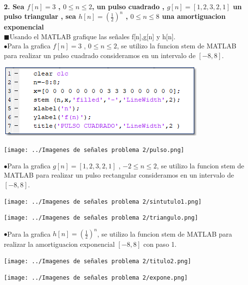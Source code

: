 \documentclass[10pt,a4paper]{article}
\begin{document}
\begin{center}
\begin{enumerate}
\textbf{2. Sea $f[n]=3$ , $0\leq n \leq 2$, un pulso cuadrado , $g[n]=[1,2,3,2,1]$ un pulso triangular , sea $h[n]=(\frac{1}{2})^n$ , $0\leq n\leq 8$ una amortiguacion exponencial}\\
$ \blacksquare$Usando el MATLAB grafique las señales f[n],g[n] y h[n].\\
$ \bullet$Para la grafica $f[n]=3$ , $ 0\leq n\leq 2$, se utilizo la funcion stem de MATLAB para realizar un pulso cuadrado consideramos en un intervalo de $[-8,8]$.\\  
\begin{center}
\includegraphics[scale=0.5]{../Imagenes de señales problema 2/Sin título.png} 
\end{center}
\begin{center}
\texttt{[image: ../Imagenes de señales problema 2/pulso.png]} 
\end{center}
$\bullet$Para la grafica $g[n]=[1,2,3,2,1]$ , $-2\leq n\leq 2$, se utilizo la funcion stem de MATLAB para realizar un pulso rectangular consideramos en un intervalo de $[-8,8]$.\begin{center}
\texttt{[image: ../Imagenes de señales problema 2/sintutulo1.png]} 
\end{center}
\begin{center}
\texttt{[image: ../Imagenes de señales problema 2/triangulo.png]} 
\end{center}
$\bullet$Para la grafica $h[n]=(\frac{1}{2})^n$, se utilizo la funcion stem de MATLAB para realizar la amortiguacion exponencial $[-8,8]$ con paso 1.
\begin{center}
\texttt{[image: ../Imagenes de señales problema 2/titulo2.png]} 
\end{center}
\begin{center}
\texttt{[image: ../Imagenes de señales problema 2/expone.png]} 
\end{center}


\end{enumerate}
\end{center}
\end{document}
